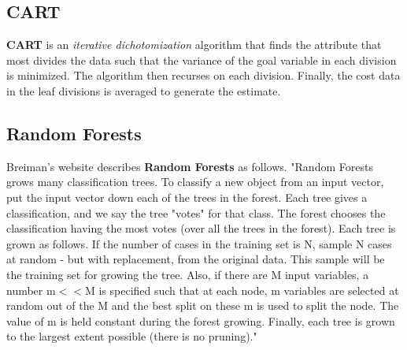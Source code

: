 \subsection{CART}
\textbf{CART} is an {\em iterative dichotomization} algorithm
that finds the attribute that most divides the data such that
the variance of the goal variable in each division is
minimized\cite{breiman84}.
The algorithm then recurses on each division.
Finally, the cost data in the leaf divisions
is averaged to generate the estimate.

\subsection{Random Forests}

Breiman's website describes \textbf{Random Forests} as
follows\cite{brieman00}. "Random Forests grows many classification
trees. To classify a new object from an input vector, put the input
vector down each of the trees in the forest. Each tree gives a
classification, and we say the tree "votes" for that class. The forest
chooses the classification having the most votes (over all the trees
in the forest). Each tree is grown as follows.
If the number of cases in the training set is N, sample N cases at
random - but with replacement, from the original data. This sample
will be the training set for growing the tree.
Also, if there are M input variables, a number m$<<$M is specified such
that at each node, m variables are selected at random out of the M and
the best split on these m is used to split the node. The value of m is
held constant during the forest growing.
Finally, each tree is grown to the largest extent possible (there is
no pruning)."




%

